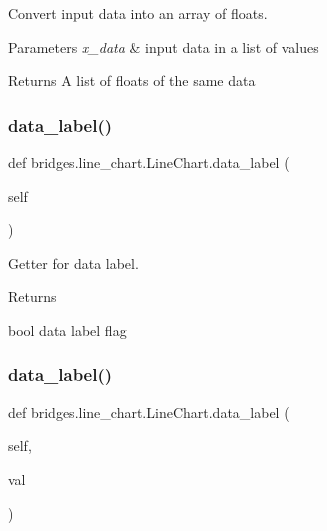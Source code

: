 Convert input data into an array of floats. 


\begin{DoxyParams}{Parameters}
{\em x\+\_\+data} & input data in a list of values \\
\hline
\end{DoxyParams}
\begin{DoxyReturn}{Returns}
A list of floats of the same data 
\end{DoxyReturn}
\mbox{\label{classbridges_1_1line__chart_1_1_line_chart_a0b93e3215dbaefa1e24bd2881393014c}} 
\subsubsection{\texorpdfstring{data\+\_\+label()}{data\_label()}\hspace{0.1cm}{\footnotesize\ttfamily [1/2]}}
{\footnotesize\ttfamily def bridges.\+line\+\_\+chart.\+Line\+Chart.\+data\+\_\+label (\begin{DoxyParamCaption}\item[{}]{self }\end{DoxyParamCaption})}



Getter for data label. 

\begin{DoxyReturn}{Returns}


bool data label flag 
\end{DoxyReturn}
\mbox{\label{classbridges_1_1line__chart_1_1_line_chart_a92796d1738604f9d6417fa7eebb4352e}} 
\subsubsection{\texorpdfstring{data\+\_\+label()}{data\_label()}\hspace{0.1cm}{\footnotesize\ttfamily [2/2]}}
{\footnotesize\ttfamily def bridges.\+line\+\_\+chart.\+Line\+Chart.\+data\+\_\+label (\begin{DoxyParamCaption}\item[{}]{self,  }\item[{}]{val }\end{DoxyParamCaption})}



